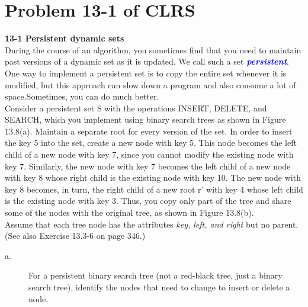 \documentclass[12pt]{article}
\begin{document}
    \section*{Problem 13-1 of CLRS}
    \textbf{13-1 Persistent dynamic sets}\\
    During the course of an algorithm, you sometimes find that you need to maintain past versions of a dynamic set as it is updated. We call such a set \textbf{\textit{\textcolor{blue}{persistent}}}. One way to implement a persistent set is to copy the entire set whenever it is modified, but this approach can slow down a program and also consume a lot of space.Sometimes, you can do much better. \\
    Consider a persistent set S with the operations INSERT, DELETE, and SEARCH,
    which you implement using binary search trees as shown in Figure 13.8(a). Maintain a separate root for every version of the set. In order to insert the key 5 into the set, create a new node with key 5. This node becomes the left child of a new node with key 7, since you cannot modify the existing node with key 7. Similarly, the new node with key 7 becomes the left child of a new node with key 8 whose right child is the existing node with key 10. The new node with key 8 becomes, in turn, the right child of a new root r' with key 4 whose left child is the existing node with key 3. Thus, you copy only part of the tree and share some of the nodes with the original tree, as shown in Figure 13.8(b).\\
    Assume that each tree node has the attributes \textit{key, left, and right} but no parent.(See also Exercise 13.3-6 on page 346.)

    \begin{description}
   
        \item[a.]
        For a persistent binary search tree (not a red-black tree, just a binary search tree), identify the nodes that need to change to insert or delete a node.\\
     \end{description}
        
\end{document}

